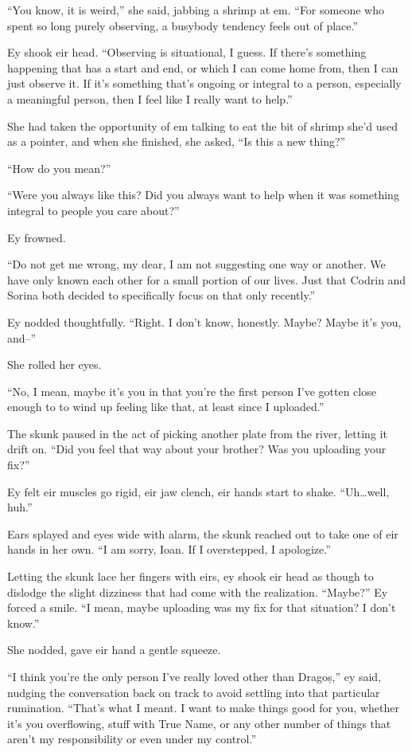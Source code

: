 ``You know, it is weird,'' she said, jabbing a shrimp at em. ``For someone who spent so long purely observing, a busybody tendency feels out of place.''

Ey shook eir head. ``Observing is situational, I guess. If there's something happening that has a start and end, or which I can come home from, then I can just observe it. If it's something that's ongoing or integral to a person, especially a meaningful person, then I feel like I really want to help.''

She had taken the opportunity of em talking to eat the bit of shrimp she'd used as a pointer, and when she finished, she asked, ``Is this a new thing?''

``How do you mean?''

``Were you always like this? Did you always want to help when it was something integral to people you care about?''

Ey frowned.

``Do not get me wrong, my dear, I am not suggesting one way or another. We have only known each other for a small portion of our lives. Just that Codrin and Sorina both decided to specifically focus on that only recently.''

Ey nodded thoughtfully. ``Right. I don't know, honestly. Maybe? Maybe it's you, and--''

She rolled her eyes.

``No, I mean, maybe it's you in that you're the first person I've gotten close enough to to wind up feeling like that, at least since I uploaded.''

The skunk paused in the act of picking another plate from the river, letting it drift on. ``Did you feel that way about your brother? Was you uploading your fix?''

Ey felt eir muscles go rigid, eir jaw clench, eir hands start to shake. ``Uh\ldots well, huh.''

Ears splayed and eyes wide with alarm, the skunk reached out to take one of eir hands in her own. ``I am sorry, Ioan. If I overstepped, I apologize.''

Letting the skunk lace her fingers with eirs, ey shook eir head as though to dislodge the slight dizziness that had come with the realization. ``Maybe?'' Ey forced a smile. ``I mean, maybe uploading was my fix for that situation? I don't know.''

She nodded, gave eir hand a gentle squeeze.

``I think you're the only person I've really loved other than Dragoș,'' ey said, nudging the conversation back on track to avoid settling into that particular rumination. ``That's what I meant. I want to make things good for you, whether it's you overflowing, stuff with True Name, or any other number of things that aren't my responsibility or even under my control.''

